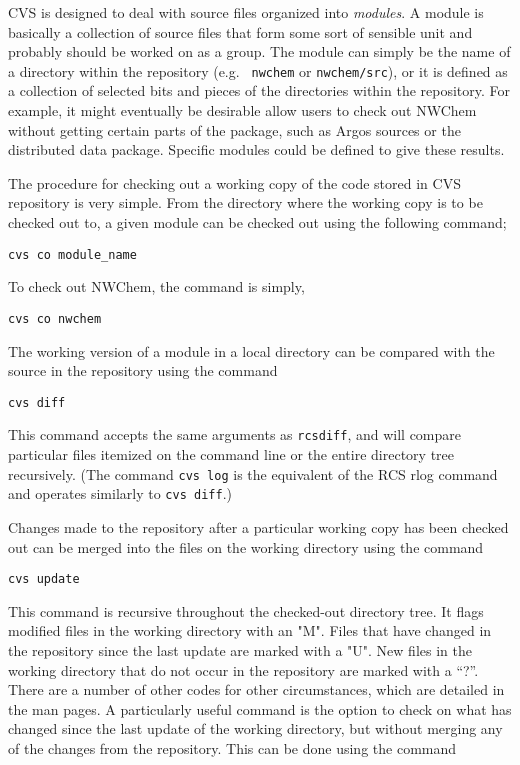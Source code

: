 CVS is designed to deal with source files organized into {\em modules}.
A module is basically a
collection of source files that form some sort of sensible unit and probably should
be worked on as a group.  The module can
simply be the name of a directory within the repository (e.g. {\tt
nwchem} or {\tt nwchem/src}), or it is defined as a collection of selected
bits and pieces of the directories within the repository.  For
example, it might eventually be desirable allow users to check out
NWChem without getting certain parts of the package, such as
Argos sources or the distributed data package.  Specific modules
could be defined to give these results.

The procedure for checking out a working copy of the code stored in
CVS repository is very simple.  From the directory where the working
copy is to be checked out to, a given module can be checked out using the following
command;

\begin{verbatim}
cvs co module_name
\end{verbatim}


To check out NWChem, the command is simply,


\begin{verbatim}
cvs co nwchem
\end{verbatim}


The working version of a module in a local directory can be compared
with the source in the repository using the command

\begin{verbatim}
cvs diff
\end{verbatim}

This command accepts the same arguments as {\tt rcsdiff}, and will compare 
particular files itemized on the command line or the entire directory tree recursively.
(The command {\tt cvs log} is the equivalent of the RCS rlog command and operates
similarly to {\tt cvs diff}.)

Changes made to the repository after a particular working copy has been checked out
can be merged into the files on the working directory using the command

\begin{verbatim}
cvs update
\end{verbatim}

This command is recursive throughout the checked-out directory tree.  It flags
modified files in the working directory  with an "M".  Files that have
changed in the repository since the last update are marked with a "U".  
New files in the working directory that do not occur in the repository
are marked with a ``?''.  There are a
number of other codes for other circumstances, which are detailed in
the man pages. A particularly useful command is the option to check on what
has changed since the last update of the working directory, but without
merging any of the changes from the repository.  This can be done using the command

